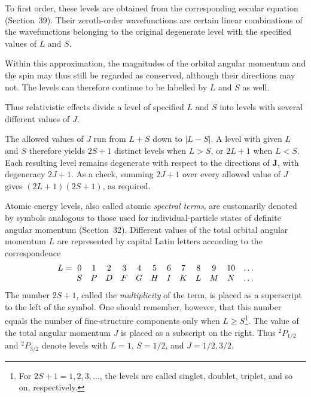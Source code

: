 To first order, these levels are obtained from the corresponding secular
equation (Section~39). Their zeroth-order wavefunctions are certain linear
combinations of the wavefunctions belonging to the original degenerate level
with the specified values of $L$ and $S$.

Within this approximation, the magnitudes of the orbital angular momentum and
the spin may thus still be regarded as conserved, although their directions
may not. The levels can therefore continue to be labelled by $L$ and $S$ as
well.

Thus relativistic effects divide a level of specified $L$ and $S$ into levels
with several different values of $J$.

The
allowed values of $J$ run from $L+S$ down to $|L-S|$. A level with given $L$
and $S$ therefore yields $2S+1$ distinct levels when $L>S$, or $2L+1$ when
$L<S$. Each resulting level remains degenerate with respect to the directions
of $\mathbf J$, with degeneracy $2J+1$. As a check, summing $2J+1$ over every
allowed value of $J$ gives $(2L+1)(2S+1)$, as required.

Atomic energy levels, also called atomic \emph{spectral terms}, are customarily
denoted by symbols analogous to those used for individual-particle states of
definite angular momentum (Section~32). Different values of the total orbital
angular momentum $L$ are represented by capital Latin letters according to
the correspondence
\[
\begin{array}{r@{\;}cccccccccccc}
L={}&0&1&2&3&4&5&6&7&8&9&10&\ldots\\
&S&P&D&F&G&H&I&K&L&M&N&\ldots
\end{array}
\]
The number $2S+1$, called the \emph{multiplicity} of the term, is placed as a
superscript to the left of the symbol. One should remember, however, that this
number equals the number of fine-structure components only when
$L\geqslant S$\footnote{For $2S+1=1,2,3,\ldots$, the levels are called
singlet, doublet, triplet, and so on, respectively.}. The value of
the total angular momentum $J$ is placed as a subscript on the right. Thus
${}^{2}P_{1/2}$ and ${}^{2}P_{3/2}$ denote levels with $L=1$, $S=1/2$, and
$J=1/2,3/2$.
